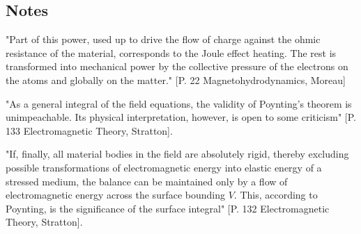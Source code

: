 \documentclass[11pt]{article}
\begin{document}
\subsection{Notes}
"Part of this power, used up to drive the flow of charge against the ohmic resistance of the material, corresponds to the Joule effect heating. The rest is transformed into mechanical power by the collective pressure of the electrons on the atoms and globally on the matter." [P. 22 Magnetohydrodynamics, Moreau]

"As a general integral of the field equations, the validity of Poynting's theorem is unimpeachable. Its physical interpretation, however, is open to some criticism" [P. 133 Electromagnetic Theory, Stratton].

"If, finally, all material bodies in the field are absolutely rigid, thereby excluding possible transformations of electromagnetic energy into elastic energy of a stressed medium, the balance can be maintained only by a flow of electromagnetic energy across the surface bounding $V$. This, according to Poynting, is the significance of the surface integral" [P. 132 Electromagnetic Theory, Stratton].
\end{document}
